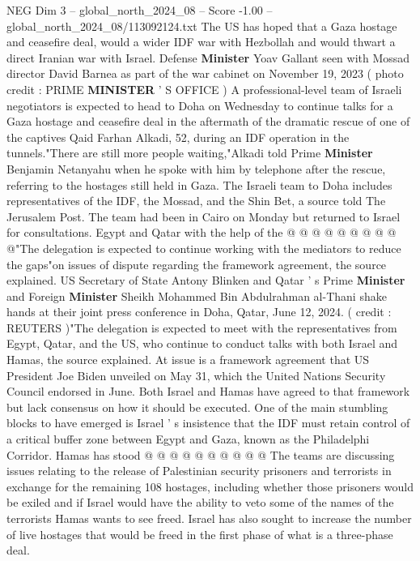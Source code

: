 \begin{textsample}{NEG Dim 3 – global\_north\_2024\_08 – Score -1.00 – global\_north\_2024\_08/113092124.txt}  \label{ex:f3_neg_327}
The US has hoped that a Gaza hostage and ceasefire deal, would a wider IDF war with Hezbollah and would thwart a direct Iranian war with Israel.
Defense \textbf{Minister} Yoav Gallant seen with Mossad director David Barnea as part of the war cabinet on November 19, 2023 ( photo credit : PRIME \textbf{MINISTER} ' S OFFICE ) A professional-level team of Israeli negotiators is expected to head to Doha on Wednesday to continue talks for a Gaza hostage and ceasefire deal in the aftermath of the dramatic rescue of one of the captives Qaid Farhan Alkadi, 52, during an IDF operation in the tunnels."There are still more people waiting,"Alkadi told Prime \textbf{Minister} Benjamin Netanyahu when he spoke with him by telephone after the rescue, referring to the hostages still held in Gaza.
The Israeli team to Doha includes representatives of the IDF, the Mossad, and the Shin Bet, a source told The Jerusalem Post.
The team had been in Cairo on Monday but returned to Israel for consultations.
Egypt and Qatar with the help of the @ @ @ @ @ @ @ @ @ @"The delegation is expected to continue working with the mediators to reduce the gaps"on issues of dispute regarding the framework agreement, the source explained.
US Secretary of State Antony Blinken and Qatar ' s Prime \textbf{Minister} and Foreign \textbf{Minister} Sheikh Mohammed Bin Abdulrahman al-Thani shake hands at their joint press conference in Doha, Qatar, June 12, 2024. ( credit : REUTERS )"The delegation is expected to meet with the representatives from Egypt, Qatar, and the US, who continue to conduct talks with both Israel and Hamas, the source explained.
At issue is a framework agreement that US President Joe Biden unveiled on May 31, which the United Nations Security Council endorsed in June.
Both Israel and Hamas have agreed to that framework but lack consensus on how it should be executed.
One of the main stumbling blocks to have emerged is Israel ' s insistence that the IDF must retain control of a critical buffer zone between Egypt and Gaza, known as the Philadelphi Corridor.
Hamas has stood @ @ @ @ @ @ @ @ @ @ The teams are discussing issues relating to the release of Palestinian security prisoners and terrorists in exchange for the remaining 108 hostages, including whether those prisoners would be exiled and if Israel would have the ability to veto some of the names of the terrorists Hamas wants to see freed.
Israel has also sought to increase the number of live hostages that would be freed in the first phase of what is a three-phase deal.

\end{textsample}
